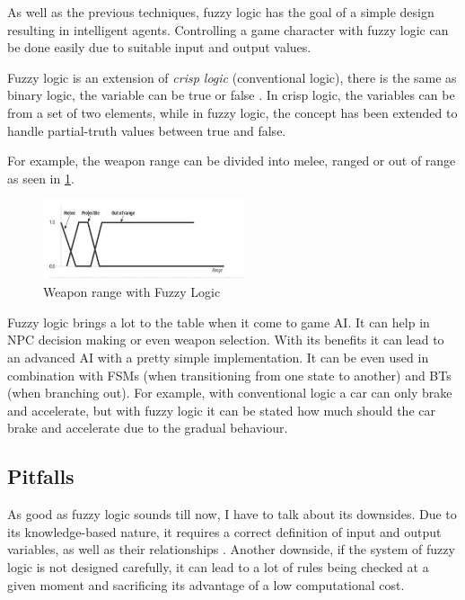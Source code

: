 \documentclass[a4paper, 12pt]{book}
\begin{document}
As well as the previous techniques, fuzzy logic has the goal of a simple design resulting in intelligent agents. Controlling a game character with fuzzy logic can be done easily due to suitable input and output values. 

Fuzzy logic is an extension of \emph{crisp logic} (conventional logic), there is the same as binary logic, the variable can be true or false \cite{FuzzyLogicBasedGameSystem}. In crisp logic, the variables can be from a set of two elements, while in fuzzy logic, the concept has been extended to handle partial-truth values between true and false. 

For example, the weapon range can be divided into melee, ranged or out of range as seen in \ref{pic4}.

\begin{figure}[h]
\begin{center}
\includegraphics[width=0.53\textwidth]{Images/weapon_range.png}
\end{center}
\caption{Weapon range with Fuzzy Logic}
\label{pic4}
\end{figure}

Fuzzy logic brings a lot to the table when it come to game AI. It can help in NPC decision making or even weapon selection. With its benefits it can lead to an advanced AI with a pretty simple implementation. It can be even used in combination with FSMs (when transitioning from one state to another) and BTs (when branching out). For example, with conventional logic a car can only brake and accelerate, but with fuzzy logic it can be stated how much should the car brake and accelerate due to the gradual behaviour. 

\subsection{Pitfalls}

As good as fuzzy logic sounds till now, I have to talk about its downsides. Due to its knowledge-based nature, it requires a correct definition of input and output variables, as well as their relationships \cite{FuzzyAIGames}. Another downside, if the system of fuzzy logic is not designed carefully, it can lead to a lot of rules being checked at a given moment and sacrificing its advantage of a low computational cost.
\end{document}
